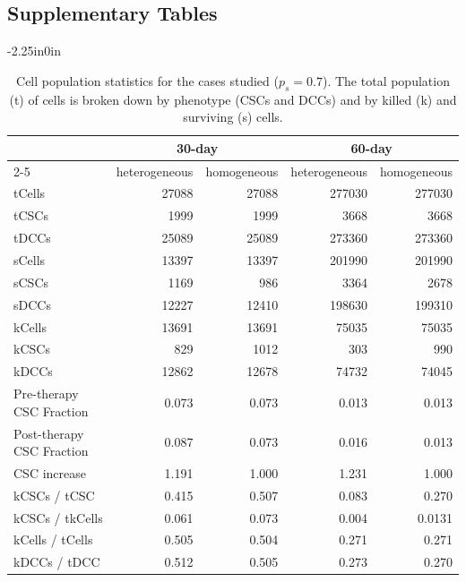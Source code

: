 \documentclass[10pt,letterpaper]{article}
\begin{document}
\subsection*{Supplementary Tables}

\begin{table}[!ht]
	\caption{Cell population statistics for the cases studied ($p_s=0.7$). The total population (t) of cells is broken down by phenotype (CSCs and DCCs) and by killed (k) and surviving (s) cells. }
	\label{tab:S1}
	\begin{adjustwidth}{-2.25in}{0in}
		\centering
		\begin{tabular}{l | r | r | r |r}
			\toprule
			{} & \multicolumn{2}{c|}{ 30-day}  & \multicolumn{2}{c|}{60-day}  \\ \cline{2-5}
			{} & heterogeneous & homogeneous & heterogeneous & homogeneous \\
			\midrule
			tCells & 27088  &27088  & 277030  & 277030 \\
			tCSCs & 1999  & 1999 & 3668 & 3668 \\
			tDCCs & 25089   & 25089 & 273360  & 273360 \\ \midrule
			sCells & 13397  & 13397 & 201990& 201990 \\
			sCSCs & 1169 & 986& 3364  & 2678 \\
			sDCCs & 12227  &  12410& 198630 & 199310\\ \midrule
			kCells & 13691& 13691 & 75035& 75035\\
			kCSCs & 829  & 1012 & 303  & 990 \\
			kDCCs & 12862 &  12678 &  74732 & 74045\\ \midrule
			Pre-therapy CSC Fraction & 0.073 & 0.073& 0.013& 0.013\\
			Post-therapy CSC Fraction & 0.087 & 0.073 & 0.016 &0.013 \\ 
			CSC increase & 1.191 & 1.000 & 1.231 & 1.000 \\ 
			\midrule
			kCSCs / tCSC & 0.415 &  0.507 & 0.083& 0.270 \\
			kCSCs / tkCells & 0.061&  0.073& 0.004& 0.0131 \\
			kCells / tCells & 0.505 & 0.504 &0.271  & 0.271  \\
			kDCCs / tDCC& 0.512 & 0.505& 0.273 & 0.270 \\
			\bottomrule
		\end{tabular}
	\end{adjustwidth}
\end{table}
\end{document}
